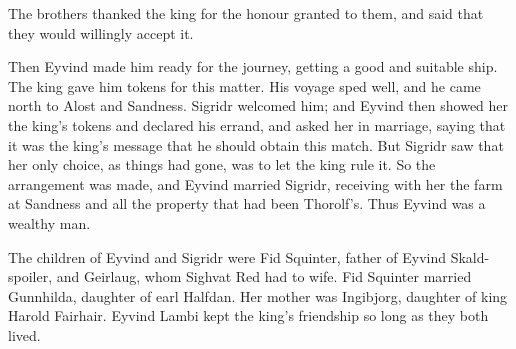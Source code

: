 The brothers thanked the king for the honour granted to them, and said that they would willingly accept it.

Then Eyvind made him ready for the journey, getting a good and suitable ship. The king gave him tokens for this matter. His voyage sped well, and he came north to Alost and Sandness. Sigridr welcomed him; and Eyvind then showed her the king's tokens and declared his errand, and asked her in marriage, saying that it was the king's message that he should obtain this match. But Sigridr saw that her only choice, as things had gone, was to let the king rule it. So the arrangement was made, and Eyvind married Sigridr, receiving with her the farm at Sandness and all the property that had been Thorolf's. Thus Eyvind was a wealthy man.

The children of Eyvind and Sigridr were Fid Squinter, father of Eyvind Skald-spoiler, and Geirlaug, whom Sighvat Red had to wife. Fid Squinter married Gunnhilda, daughter of earl Halfdan. Her mother was Ingibjorg, daughter of king Harold Fairhair. Eyvind Lambi kept the king's friendship so long as they both lived.
